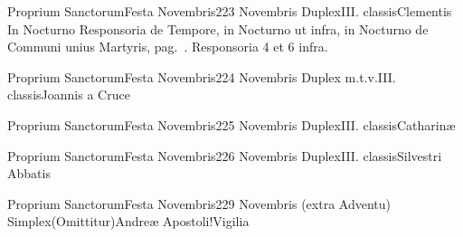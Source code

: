 \documentclass[liber-responsorialis_aestivus.tex]{subfiles}
\begin{document}
	{Proprium Sanctorum}{Festa Novembris}{2}{23 Novembris}
	{Duplex}{III. classis}{Clementis}
	{In  Nocturno Responsoria de Tempore, in  Nocturno ut infra, in  Nocturno de Communi unius Martyris, pag.\ \pageref{M-UMEX}.}
	{Responsoria 4 et 6 infra.}

	{Proprium Sanctorum}{Festa Novembris}{2}{24 Novembris}
	{Duplex m.t.v.}{III. classis}{Joannis a Cruce}
	{\conprubric}
	{\respdetemp}

	{Proprium Sanctorum}{Festa Novembris}{2}{25 Novembris}
	{Duplex}{III. classis}{Catharinæ}
	{\vmrubric}
	{\respdetemp}

	{Proprium Sanctorum}{Festa Novembris}{2}{26 Novembris}
	{Duplex}{III. classis}{Silvestri Abbatis}
	{\conprubric}
	{\respdetemp}

	{Proprium Sanctorum}{Festa Novembris}{2}{29 Novembris (extra Adventu)}
	{Simplex}{(Omittitur)}{Andreæ Apostoli!Vigilia}
	{}
	{}
\rubric{\respdetemp}
\end{document}

